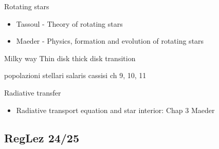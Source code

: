 \begin{frame}{Rotating stars}
\begin{itemize}
\item Tassoul - Theory of rotating stars
\item Maeder - Physics, formation and evolution of rotating stars
\end{itemize}
\end{frame}

\begin{frame}{Milky way}
Thin disk thick disk transition
\end{frame}

\begin{frame}{popolazioni stellari}
salaris cassisi ch 9, 10, 11
\end{frame}

\begin{frame}{Radiative transfer}
    \begin{itemize}
        \item Radiative transport equation and star interior: Chap 3 Maeder
    \end{itemize}
\end{frame}

\subsection{RegLez 24/25}

